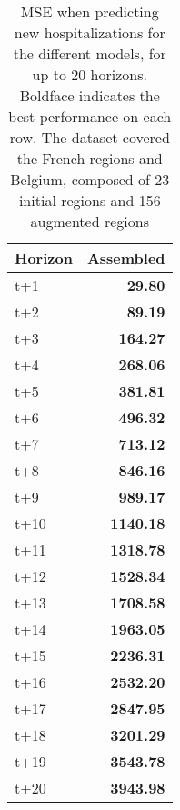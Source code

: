 \begin{table}[H]
\centering
\caption{MSE when predicting new hospitalizations for the different models, for up to 20 horizons. Boldface indicates the best performance on each row. The dataset covered the French regions and Belgium, composed of 23 initial regions and 156 augmented regions }
\label{tab:MSE_comparison}
\begin{tabular}{lr}
\toprule
Horizon &  Assembled \\
\midrule
t+1  & \textbf{29.80}  \\
t+2  & \textbf{89.19}  \\
t+3  & \textbf{164.27}  \\
t+4  & \textbf{268.06}  \\
t+5  & \textbf{381.81}  \\
t+6  & \textbf{496.32}  \\
t+7  & \textbf{713.12}  \\
t+8  & \textbf{846.16}  \\
t+9  & \textbf{989.17}  \\
t+10  & \textbf{1140.18}  \\
t+11  & \textbf{1318.78}  \\
t+12  & \textbf{1528.34}  \\
t+13  & \textbf{1708.58}  \\
t+14  & \textbf{1963.05}  \\
t+15  & \textbf{2236.31}  \\
t+16  & \textbf{2532.20}  \\
t+17  & \textbf{2847.95}  \\
t+18  & \textbf{3201.29}  \\
t+19  & \textbf{3543.78}  \\
t+20  & \textbf{3943.98}  \\

\bottomrule
\end{tabular}
\end{table}
